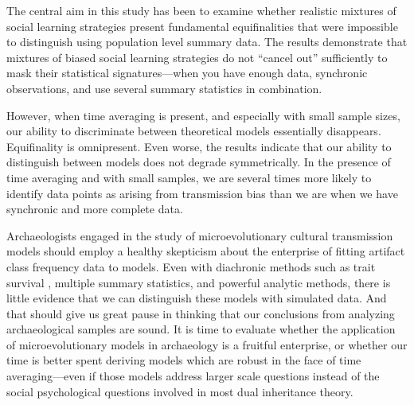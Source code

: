 The central aim in this study has been to examine whether realistic mixtures of social learning strategies present fundamental equifinalities that were impossible to distinguish using population level summary data.  The results demonstrate that mixtures of biased social learning strategies do not ``cancel out'' sufficiently to mask their statistical signatures---when you have enough data, synchronic observations, and use several summary statistics in combination.  

However, when time averaging is present, and especially with small sample sizes, our ability to discriminate between theoretical models essentially disappears.  Equifinality is omnipresent.  Even worse, the results indicate that our ability to distinguish between models does not degrade symmetrically.  In the presence of time averaging and with small samples, we are several times more likely to identify data points as arising from transmission bias than we are when we have synchronic and more complete data.  

Archaeologists engaged in the study of microevolutionary cultural transmission models should employ a healthy skepticism about the enterprise of fitting artifact class frequency data to models.  Even with diachronic methods such as trait survival \citep{Kandler2013}, multiple summary statistics, and powerful analytic methods, there is little evidence that we can distinguish these models with simulated data.  And that should give us great pause in thinking that our conclusions from analyzing archaeological samples are sound.  It is time to evaluate whether the application of microevolutionary models in archaeology is a fruitful enterprise, or whether our time is better spent deriving models which are robust in the face of time averaging---even if those models address larger scale questions instead of the social psychological questions involved in most dual inheritance theory.  

